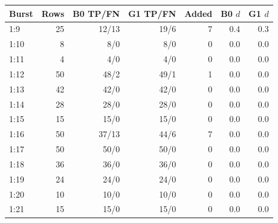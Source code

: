 \begin{tabular}{lrrrrrr}
\toprule
Burst & Rows & B0 TP/FN & G1 TP/FN & Added & B0 $d$ & G1 $d$ \\
\midrule
1:9 & 25 & 12/13 & 19/6 & 7 & 0.4 & 0.3 \\
1:10 & 8 & 8/0 & 8/0 & 0 & 0.0 & 0.0 \\
1:11 & 4 & 4/0 & 4/0 & 0 & 0.0 & 0.0 \\
1:12 & 50 & 48/2 & 49/1 & 1 & 0.0 & 0.0 \\
1:13 & 42 & 42/0 & 42/0 & 0 & 0.0 & 0.0 \\
1:14 & 28 & 28/0 & 28/0 & 0 & 0.0 & 0.0 \\
1:15 & 15 & 15/0 & 15/0 & 0 & 0.0 & 0.0 \\
1:16 & 50 & 37/13 & 44/6 & 7 & 0.0 & 0.0 \\
1:17 & 50 & 50/0 & 50/0 & 0 & 0.0 & 0.0 \\
1:18 & 36 & 36/0 & 36/0 & 0 & 0.0 & 0.0 \\
1:19 & 24 & 24/0 & 24/0 & 0 & 0.0 & 0.0 \\
1:20 & 10 & 10/0 & 10/0 & 0 & 0.0 & 0.0 \\
1:21 & 15 & 15/0 & 15/0 & 0 & 0.0 & 0.0 \\
\bottomrule
\end{tabular}
